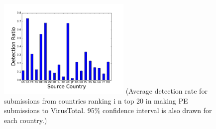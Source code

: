 \begin{figure}[t!]
\begin{center}
\includegraphics[width=2.5in]{figure/Country}
{\footnotesize{(Average detection rate for submissions from countries ranking i
n top 20 in making PE submissions to VirusTotal. 
95\% confidence interval is also drawn for each country.)}}
\end{center}
\end{figure}